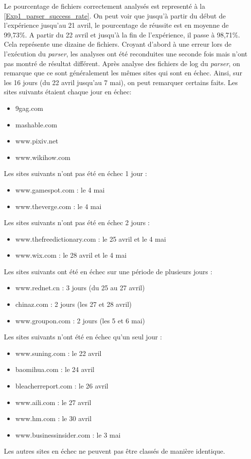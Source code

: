 Le pourcentage de fichiers correctement analysés est representé à la \autoref{Exp1_parser_success_rate}. On peut voir que jusqu'à partir du début de l'expérience jusqu'au 21 avril, le pourcentage de réussite est en moyenne de 99,73\%. A partir du 22 avril et jusqu'à la fin de l'expérience, il passe à 98,71\%. Cela représente une dizaine de fichiers.
Croyant d'abord à une erreur lors de l'exécution du \textit{parser}, les analyses ont été reconduites une seconde fois mais n'ont pas montré de résultat différent.
Après analyse des fichiers de log du \textit{parser}, on remarque que ce sont généralement les mêmes sites qui sont en échec.
Ainsi, sur les 16 jours (du 22 avril jusqu'au 7 mai), on peut remarquer certains faits.
\newline
Les sites suivants étaient chaque jour en échec:
\begin{itemize}
  \item 9gag.com
  \item mashable.com
  \item www.pixiv.net
  \item www.wikihow.com
  \newline
\end{itemize}
Les sites suivants n'ont pas été en échec 1 jour :
\begin{itemize}
  \item www.gamespot.com : le 4 mai
  \item www.theverge.com : le 4 mai
  \newline
\end{itemize}
Les sites suivants n'ont pas été en échec 2 jours :
\begin{itemize}
  \item www.thefreedictionary.com : le 25 avril et le 4 mai
  \item www.wix.com : le 28 avril et le 4 mai
  \newline
\end{itemize}
Les sites suivants ont été en échec sur une période de plusieurs jours :
\begin{itemize}
  \item www.rednet.cn : 3 jours (du 25 au 27 avril)
  \item chinaz.com : 2 jours (les 27 et 28 avril)
  \item www.groupon.com : 2 jours (les 5 et 6 mai)
  \newline
\end{itemize}
Les sites suivants n'ont été en échec qu'un seul jour :
\begin{itemize}
  \item www.suning.com : le 22 avril
  \item baomihua.com : le 24 avril
  \item bleacherreport.com : le 26 avril
  \item www.aili.com : le 27 avril
  \item www.hm.com : le 30 avril
  \item www.businessinsider.com : le 3 mai
  \newline
\end{itemize}
Les autres sites en échec ne peuvent pas être classés de manière identique.\\

